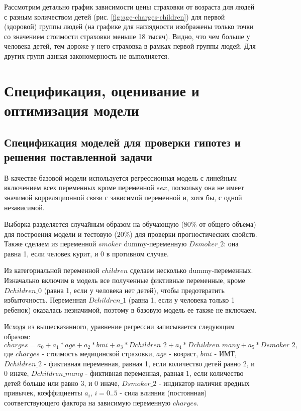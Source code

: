 \documentclass[a4paper,12pt]{article}
\begin{document}
Рассмотрим детально график зависимости цены страховки от возраста для людей с разным количеством детей (рис. \ref{fig:age-charges-children}) для первой (здоровой) группы людей (на графике для наглядности изображены только точки со значением стоимости страховки меньше 18 тысяч). Видно, что чем больше у человека детей, тем дороже у него страховка в рамках первой группы людей. Для других групп данная закономерность не выполняется.

\section{Спецификация, оценивание и оптимизация модели}

\subsection{Спецификация моделей для проверки гипотез и решения поставленной задачи}

В качестве базовой модели используется регрессионная модель с линейным включением всех переменных кроме переменной $sex$, поскольку она не имеет значимой корреляционной связи с зависимой переменной и, хотя бы, с одной независимой. 

Выборка разделяется случайным образом на обучающую ($80\%$ от общего объема) для построения модели и тестовую ($20\%$) для проверки прогностических свойств. Также сделаем из переменной $smoker$ dummy-переменную $Dsmoker\_2$: она равна 1, если человек курит, и 0 в противном случае.

Из категориальной переменной $children$ сделаем несколько dummy-переменных. Изначально включим в модель все полученные фиктивные переменные, кроме $Dchildren\_0$ (равна 1, если у человека нет детей), чтобы предотвратить избыточность. Переменная $Dchildren\_1$ (равна 1, если у человека только 1 ребенок) оказалась незначимой, поэтому в базовую модель ее также не включаем. 

Исходя из вышесказанного, уравнение регрессии записывается следующим образом:
\[charges = a_0 + a_1 * age + a_2 * bmi + a_3 * Dchildren\_2 + a_4 * Dchildren\_many + a_5 * Dsmoker\_2,\]	
где $charges$ - стоимость медицинской страховки,
$age$ - возраст,
$bmi$ - ИМТ,
$Dchildren\_2$ - фиктивная переменная, равная 1, если количество детей равно 2, и 0 иначе,
$Dchildren\_many$ - фиктивная переменная, равная 1, если количество детей больше или равно 3, и 0 иначе,
$Dsmoker\_2$ - индикатор наличия вредных привычек, коэффициенты $a_i$, $i=0..5$ - сила влияния (постоянная) соответствующего фактора на зависимую переменную $charges$.
\end{document}
